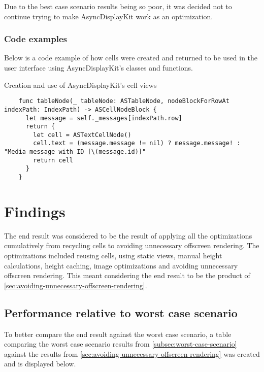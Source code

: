 \documentclass[a4paper,12pt]{article}
\begin{document}
Due to the best case scenario results being so poor, it was decided not to continue trying to make AsyncDisplayKit work as an optimization.

\subsubsection{Code examples}
Below is a code example of how cells were created and returned to be used in the user interface using AsyncDisplayKit's classes and functions.
\begin{listing}[H]
  \caption{Creation and use of AsyncDisplayKit's cell views}
  \begin{verbatim}
    func tableNode(_ tableNode: ASTableNode, nodeBlockForRowAt indexPath: IndexPath) -> ASCellNodeBlock {
      let message = self._messages[indexPath.row]
      return {
        let cell = ASTextCellNode()
        cell.text = (message.message != nil) ? message.message! : "Media message with ID [\(message.id)]"
        return cell
      }
    }
  \end{verbatim}
\end{listing}

\section{Findings}
The end result was considered to be the result of applying all the optimizations cumulatively from recycling cells to avoiding unnecessary offscreen rendering. The optimizations included reusing cells, using static views, manual height calculations, height caching, image optimizations and avoiding unnecessary offscreen rendering. This meant considering the end result to be the product of \autoref{sec:avoiding-unnecessary-offscreen-rendering}.

\subsection{Performance relative to worst case scenario}
To better compare the end result against the worst case scenario, a table comparing the worst case scenario results from \autoref{subsec:worst-case-scenario} against the results from \autoref{sec:avoiding-unnecessary-offscreen-rendering} was created and is displayed below.
\end{document}
